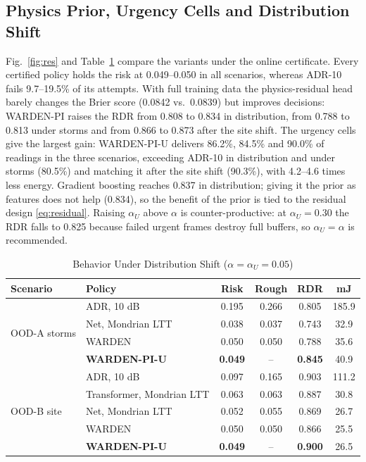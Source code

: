 \documentclass[journal]{IEEEtran}\def\WARDENieee{1}%
\begin{document}
\subsection{Physics Prior, Urgency Cells and Distribution Shift}
Fig.~\ref{fig:res} and Table~\ref{tab:shift} compare the variants under the online certificate. Every certified policy holds the risk at 0.049--0.050 in all scenarios, whereas ADR-10 fails 9.7--19.5\% of its attempts. With full training data the physics-residual head barely changes the Brier score (0.0842 vs.\ 0.0839) but improves decisions: WARDEN-PI raises the RDR from 0.808 to 0.834 in distribution, from 0.788 to 0.813 under storms and from 0.866 to 0.873 after the site shift. The urgency cells give the largest gain: WARDEN-PI-U delivers 86.2\%, 84.5\% and 90.0\% of readings in the three scenarios, exceeding ADR-10 in distribution and under storms (80.5\%) and matching it after the site shift (90.3\%), with 4.2--4.6 times less energy. Gradient boosting reaches 0.837 in distribution; giving it the prior as features does not help (0.834), so the benefit of the prior is tied to the residual design \eqref{eq:residual}. Raising $\alpha_U$ above $\alpha$ is counter-productive: at $\alpha_U=0.30$ the RDR falls to 0.825 because failed urgent frames destroy full buffers, so $\alpha_U=\alpha$ is recommended.



\begin{table}[!t]
\caption{Behavior Under Distribution Shift ($\alpha=\alpha_U=0.05$)}\label{tab:shift}
\centering\scriptsize\setlength{\tabcolsep}{3pt}
\begin{tabular}{@{}llcccc@{}}
\toprule
Scenario & Policy & Risk & Rough & RDR & mJ\\\midrule
\multirow{4}{*}{OOD-A storms} & ADR, 10 dB & 0.195 & 0.266 & 0.805 & 185.9\\
& Net, Mondrian LTT & 0.038 & 0.037 & 0.743 & 32.9\\
& WARDEN & 0.050 & 0.050 & 0.788 & 35.6\\
& \textbf{WARDEN-PI-U} & \textbf{0.049} & -- & \textbf{0.845} & 40.9\\\midrule
\multirow{5}{*}{OOD-B site} & ADR, 10 dB & 0.097 & 0.165 & 0.903 & 111.2\\
& Transformer, Mondrian LTT & 0.063 & 0.063 & 0.887 & 30.8\\
& Net, Mondrian LTT & 0.052 & 0.055 & 0.869 & 26.7\\
& WARDEN & 0.050 & 0.050 & 0.866 & 25.5\\
& \textbf{WARDEN-PI-U} & \textbf{0.049} & -- & \textbf{0.900} & 26.5\\
\bottomrule
\end{tabular}
\end{table}
\end{document}
